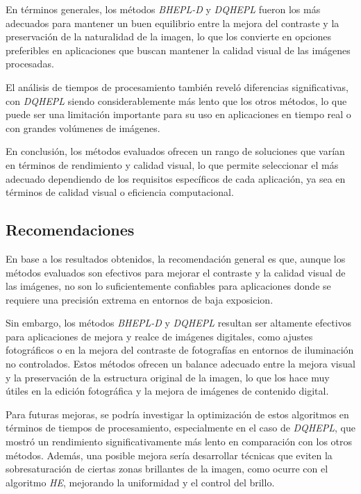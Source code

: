 \documentclass[sigchi]{acmart}
\begin{document}
En términos generales, los métodos \emph{BHEPL-D} y \emph{DQHEPL} fueron los más adecuados
para mantener un buen equilibrio entre la mejora del contraste y la preservación de la
naturalidad de la imagen, lo que los convierte en opciones preferibles en aplicaciones que
buscan mantener la calidad visual de las imágenes procesadas.

El análisis de tiempos de procesamiento también reveló diferencias significativas, con
\emph{DQHEPL} siendo considerablemente más lento que los otros métodos, lo que puede ser una
limitación importante para su uso en aplicaciones en tiempo real o con grandes volúmenes de
imágenes.

En conclusión, los métodos evaluados ofrecen un rango de soluciones que varían en términos de
rendimiento y calidad visual, lo que permite seleccionar el más adecuado dependiendo de los
requisitos específicos de cada aplicación, ya sea en términos de calidad visual o eficiencia
computacional.

\subsection{Recomendaciones}
\label{subsec:recomendaciones}

En base a los resultados obtenidos, la recomendación general es que, aunque los métodos
evaluados son efectivos para mejorar el contraste y la calidad visual de las imágenes, no son
lo suficientemente confiables para aplicaciones donde se requiere una precisión extrema
en entornos de baja exposicion.

Sin embargo, los métodos \emph{BHEPL-D} y \emph{DQHEPL} resultan ser altamente efectivos
para aplicaciones de mejora y realce de imágenes digitales, como ajustes fotográficos o en la
mejora del contraste de fotografías en entornos de iluminación no controlados. Estos métodos
ofrecen un balance adecuado entre la mejora visual y la preservación de la estructura original
de la imagen, lo que los hace muy útiles en la edición fotográfica y la mejora de imágenes de
contenido digital.

Para futuras mejoras, se podría investigar la optimización de estos algoritmos en términos de
tiempos de procesamiento, especialmente en el caso de \emph{DQHEPL}, que mostró un
rendimiento significativamente más lento en comparación con los otros métodos. Además, una
posible mejora sería desarrollar técnicas que eviten la sobresaturación de ciertas zonas
brillantes de la imagen, como ocurre con el algoritmo \emph{HE}, mejorando la uniformidad y
el control del brillo.
\end{document}
